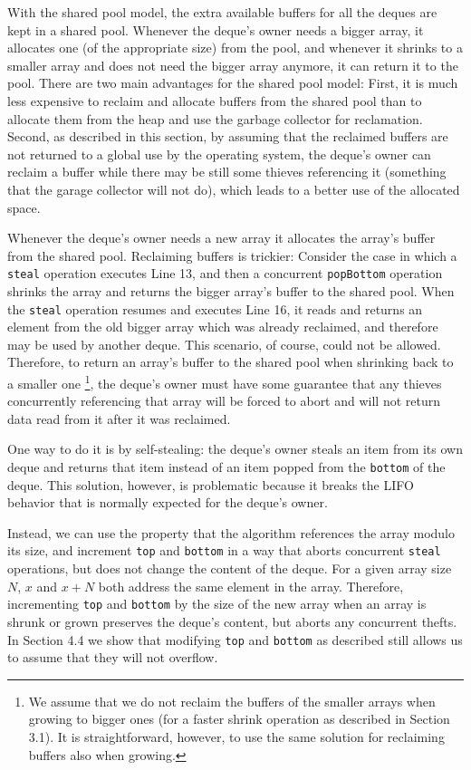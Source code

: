 With the shared pool model, the extra available buffers for all the
deques are kept in a shared pool. Whenever the deque's owner needs a
bigger array, it allocates one (of the appropriate size) from the
pool, and whenever it shrinks to a smaller array and does not need the
bigger array anymore, it can return it to the pool. There are two main
advantages for the shared pool model: First, it is much less expensive
to reclaim and allocate buffers from the shared pool than to allocate
them from the heap and use the garbage collector for
reclamation. Second, as described in this section, by assuming that
the reclaimed buffers are not returned to a global use by the
operating system, the deque's owner can reclaim a buffer while there
may be still some thieves referencing it (something that the garage
collector will not do), which leads to a better use of the allocated
space.


Whenever the deque's owner needs a new array it allocates the array's
buffer from the shared pool. Reclaiming buffers is trickier: Consider
the case in which a \lstinline!steal! operation executes Line 13, and
then a concurrent \lstinline!popBottom! operation shrinks the array
and returns the bigger array's buffer to the shared pool. When the
\lstinline!steal! operation resumes and executes Line 16, it reads and
returns an element from the old bigger array which was already
reclaimed, and therefore may be used by another deque. This scenario,
of course, could not be allowed. Therefore, to return an array's
buffer to the shared pool when shrinking back to a smaller one
\footnote{We assume that we do not reclaim the buffers of the smaller
 arrays when growing to bigger ones (for a faster shrink operation as
  described in Section 3.1). It is straightforward, however, to use
  the same solution for reclaiming buffers also when growing.}, the
deque's owner must have some guarantee that any thieves concurrently
referencing that array will be forced to abort and will not return
data read from it after it was reclaimed.

One way to do it is by self-stealing: the deque's owner steals an item
from its own deque and returns that item instead of an item popped
from the \lstinline!bottom! of the deque. This solution, however, is
problematic because it breaks the LIFO behavior that is normally
expected for the deque's owner.

Instead, we can use the property that the algorithm references the
array modulo its size, and increment \lstinline!top! and
\lstinline!bottom! in a way that aborts concurrent \lstinline!steal!
operations, but does not change the content of the deque. For a given
array size $N$, $x$ and $x + N$ both address the same element in the
array. Therefore, incrementing \lstinline!top! and \lstinline!bottom!
by the size of the new array when an array is shrunk or grown
preserves the deque's content, but aborts any concurrent thefts. In
Section 4.4 we show that modifying \lstinline!top! and
\lstinline!bottom! as described still allows us to assume that they
will not overflow.

